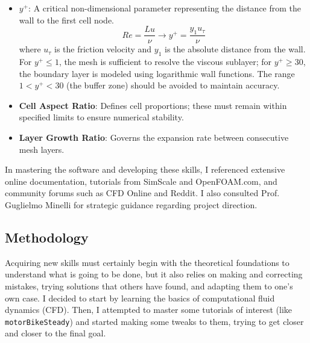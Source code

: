 \documentclass[a4paper]{article}
\begin{document}
	\begin{itemize}
		\item \textbf{$y^+$}: A critical non-dimensional parameter representing the distance from the wall to the first cell node.
		$$Re= \frac{Lu}{\nu}\to y^+= \frac{y_1u_\tau}{\nu}$$
		where $u_\tau$ is the friction velocity and $y_1$ is the absolute distance from the wall.
		For $y^+\leq 1$, the mesh is sufficient to resolve the viscous sublayer;
		for $y^+\geq 30$, the boundary layer is modeled using logarithmic wall functions.
		The range $1 < y^+ < 30$ (the buffer zone) should be avoided to maintain accuracy.
		\item \textbf{Cell Aspect Ratio}: Defines cell proportions; these must remain within specified limits to ensure numerical stability.
		\item \textbf{Layer Growth Ratio}: Governs the expansion rate between consecutive mesh layers.
	\end{itemize}
	
	In mastering the software and developing these skills, I referenced extensive online documentation, tutorials from SimScale and OpenFOAM.com, and community forums such as CFD Online and Reddit.
	I also consulted Prof. Guglielmo Minelli for strategic guidance regarding project direction.
	\subsection{Methodology}
	Acquiring new skills must certainly begin with the theoretical foundations to understand what is going to be done, but it also relies on making and correcting mistakes, trying solutions that others have found, and adapting them to one's own case. I decided to start by learning the basics of computational fluid dynamics (CFD). Then, I attempted to master some tutorials of interest (like \texttt{motorBikeSteady}) and started making some tweaks to them, trying to get closer and closer to the final goal.
	
\end{document}
